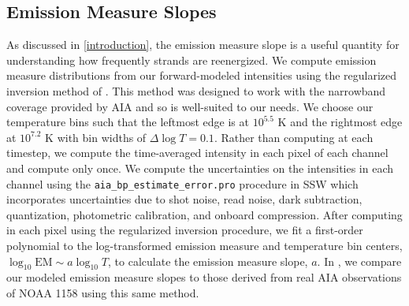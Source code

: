 \subsection{Emission Measure Slopes}\label{em_slopes}

As discussed in \autoref{introduction}, the emission measure slope is a useful quantity for understanding how frequently strands are reenergized. We compute emission measure distributions from our forward-modeled intensities using the regularized inversion method of \citet{hannah_differential_2012}. This method was designed to work with the narrowband coverage provided by AIA and so is well-suited to our needs. We choose our temperature bins such that the leftmost edge is at $10^{5.5}$ K and the rightmost edge at $10^{7.2}$ K with bin widths of $\Delta\log T=0.1$. Rather than computing \dem{} at each timestep, we compute the time-averaged intensity in each pixel of each channel and compute \dem{} only once. We compute the uncertainties on the intensities in each channel using the \texttt{aia\_bp\_estimate\_error.pro} procedure in SSW which incorporates uncertainties due to shot noise, read noise, dark subtraction, quantization, photometric calibration, and onboard compression. After computing \dem{} in each pixel using the regularized inversion procedure, we fit a first-order polynomial to the log-transformed emission measure and temperature bin centers, $\log_{10}\mathrm{EM}\sim a\log_{10}T$, to calculate the emission measure slope, $a$. In , we compare our modeled emission measure slopes to those derived from real AIA observations of NOAA 1158 using this same method.

